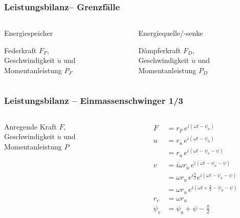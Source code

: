 \documentclass[hyperref={pdfpagemode=FullScreen, colorlinks=false}]{beamer}
\begin{document}
\begin{frame}
\frametitle{Leistungsbilanz{\normalsize-- Grenzfälle} }
\begin{columns}
        \begin{column}[t]{.5\linewidth}
        \hspace{9mm} Energiespeicher
        
\bigskip

         Federkraft {\color{red}$F_F$},\\ 
         Geschwindigkeit {\color{blue}$\dot{u}$} und\\
         Momentanleistung {\color{green}$P_F$}
        \end{column}
        \begin{column}[t]{.5\linewidth}
        \hspace{7mm} Energiequelle/-senke
        
        \bigskip

         Dämpferkraft {\color{red}$F_D$},\\ 
         Geschwindigkeit {\color{blue}$\dot{u}$} und\\
         Momentanleistung {\color{green}$P_D$}         
\end{column}
\end{columns}
\end{frame}

\begin{frame}
\frametitle{Leistungsbilanz {\normalsize -- Einmassenschwinger 1/3}}
\begin{columns}
        \begin{column}[t]{.5\linewidth}
             
\bigskip

         Anregende Kraft {\color{red}$F$},\\ 
         Geschwindigkeit {\color{blue}$\dot{u}$} und\\
         Momentanleistung {\color{green}$P$}
        \end{column}
        \begin{column}[t]{.5\linewidth}
        \vspace{-4.5cm}
\begin{align*}
 F&=r_F\,e^{i(\omega t-\psi_a)} \\
 u&=r_u\,e^{i(\omega t-\psi_u)} \\
  &=r_u\,e^{i(\omega t-\psi_a-\psi)} \\
 v&=i\omega r_u\,e^{i(\omega t-\psi_a-\psi)}\\
 &=\omega r_u\, e^{i\frac{\pi}{2}} e^{i(\omega t-\psi_a-\psi)}\\
 & =\omega r_u \,e^{i\left(\omega t+\frac{\pi}{2}-\psi_a-\psi\right)}\\
 r_v&=\omega r_u \\
 \psi_v&=\psi_a+\psi-\frac{\pi}{2}
 \end{align*}
\end{column}
\end{columns}
\end{frame}
\end{document}
